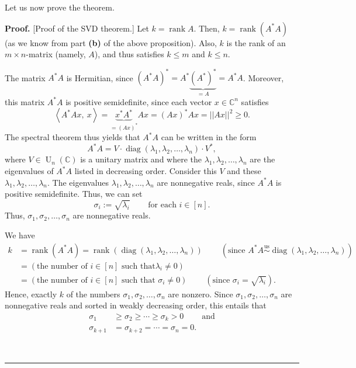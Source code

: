 \documentclass[numbers=enddot,12pt,final,onecolumn,notitlepage]{scrartcl}%
\numberwithin{exer}{subsection}
\theoremstyle{definition}
\newenvironment{proof}[1][Proof]{\noindent\textbf{#1.} }{\ \rule{0.5em}{0.5em}}
\begin{document}
Let us now prove the theorem.

\begin{proof}
[Proof of the SVD theorem.] Let $k=\operatorname*{rank}A$. Then,
$k=\operatorname*{rank}\left(  A^{\ast}A\right)  $ (as we know from part
\textbf{(b)} of the above proposition). Also, $k$ is the rank of an $m\times
n$-matrix (namely, $A$), and thus satisfies $k\leq m$ and $k\leq n$.

The matrix $A^{\ast}A$ is Hermitian, since $\left(  A^{\ast}A\right)  ^{\ast
}=A^{\ast}\underbrace{\left(  A^{\ast}\right)  ^{\ast}}_{=A}=A^{\ast}A$.
Moreover, this matrix $A^{\ast}A$ is positive semidefinite, since each vector
$x\in\mathbb{C}^{n}$ satisfies%
\[
\left\langle A^{\ast}Ax,\ x\right\rangle =\underbrace{x^{\ast}A^{\ast}%
}_{=\left(  Ax\right)  ^{\ast}}Ax=\left(  Ax\right)  ^{\ast}Ax=\left\vert
\left\vert Ax\right\vert \right\vert ^{2}\geq0.
\]
The spectral theorem thus yields that $A^{\ast}A$ can be written in the form
\[
A^{\ast}A=V\cdot\operatorname*{diag}\left(  \lambda_{1},\lambda_{2}%
,\ldots,\lambda_{n}\right)  \cdot V^{\ast},
\]
where $V\in\operatorname*{U}\nolimits_{n}\left(  \mathbb{C}\right)  $ is a
unitary matrix and where the $\lambda_{1},\lambda_{2},\ldots,\lambda_{n}$ are
the eigenvalues of $A^{\ast}A$ listed in decreasing order. Consider this $V$
and these $\lambda_{1},\lambda_{2},\ldots,\lambda_{n}$. The eigenvalues
$\lambda_{1},\lambda_{2},\ldots,\lambda_{n}$ are nonnegative reals, since
$A^{\ast}A$ is positive semidefinite. Thus, we can set%
\[
\sigma_{i}:=\sqrt{\lambda_{i}}\ \ \ \ \ \ \ \ \ \ \text{for each }i\in\left[
n\right]  .
\]
Thus, $\sigma_{1},\sigma_{2},\ldots,\sigma_{n}$ are nonnegative reals.

We have%
\begin{align*}
k  & =\operatorname*{rank}\left(  A^{\ast}A\right)  =\operatorname*{rank}%
\left(  \operatorname*{diag}\left(  \lambda_{1},\lambda_{2},\ldots,\lambda
_{n}\right)  \right)  \ \ \ \ \ \ \ \ \ \ \left(  \text{since }A^{\ast
}A\overset{\operatorname*{us}}{\sim}\operatorname*{diag}\left(  \lambda
_{1},\lambda_{2},\ldots,\lambda_{n}\right)  \right)  \\
& =\left(  \text{the number of }i\in\left[  n\right]  \text{ such that
}\lambda_{i}\neq0\right)  \\
& =\left(  \text{the number of }i\in\left[  n\right]  \text{ such that }%
\sigma_{i}\neq0\right)  \ \ \ \ \ \ \ \ \ \ \left(  \text{since }\sigma
_{i}=\sqrt{\lambda_{i}}\right)  .
\end{align*}
Hence, exactly $k$ of the numbers $\sigma_{1},\sigma_{2},\ldots,\sigma_{n}$
are nonzero. Since $\sigma_{1},\sigma_{2},\ldots,\sigma_{n}$ are nonnegative
reals and sorted in weakly decreasing order, this entails that%
\begin{align*}
\sigma_{1}  & \geq\sigma_{2}\geq\cdots\geq\sigma_{k}%
>0\ \ \ \ \ \ \ \ \ \ \text{and}\\
\sigma_{k+1}  & =\sigma_{k+2}=\cdots=\sigma_{n}=0.
\end{align*}



\end{proof}
\end{document}
